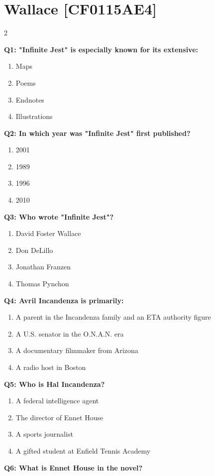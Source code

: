 \documentclass[10pt]{article}
\begin{document}
\section*{Wallace \footnotesize [CF0115AE4]}
\begin{multicols}{2}

\textbf{Q1: "Infinite Jest" is especially known for its extensive:}

\begin{enumerate}[label=\arabic*.]
\item Maps
\item Poems
\item Endnotes
\item Illustrations
\end{enumerate}
\textbf{Q2: In which year was "Infinite Jest" first published?}

\begin{enumerate}[label=\arabic*.]
\item 2001
\item 1989
\item 1996
\item 2010
\end{enumerate}
\textbf{Q3: Who wrote "Infinite Jest"?}

\begin{enumerate}[label=\arabic*.]
\item David Foster Wallace
\item Don DeLillo
\item Jonathan Franzen
\item Thomas Pynchon
\end{enumerate}
\textbf{Q4: Avril Incandenza is primarily:}

\begin{enumerate}[label=\arabic*.]
\item A parent in the Incandenza family and an ETA authority figure
\item A U.S. senator in the O.N.A.N. era
\item A documentary filmmaker from Arizona
\item A radio host in Boston
\end{enumerate}
\textbf{Q5: Who is Hal Incandenza?}

\begin{enumerate}[label=\arabic*.]
\item A federal intelligence agent
\item The director of Ennet House
\item A sports journalist
\item A gifted student at Enfield Tennis Academy
\end{enumerate}
\textbf{Q6: What is Ennet House in the novel?}


\end{multicols}
\end{document}
